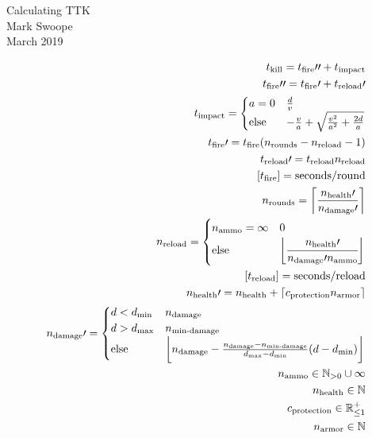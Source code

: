 \documentclass[a4paper,12pt]{article}
\begin{document}
	\begin{center}
		Calculating TTK \\
		Mark Swoope \\
		March 2019 \\
	\end{center}
	\begin{align*}
		t_\text{kill} = t_\text{fire}\prime\prime + t_\text{impact} \\
		t_\text{fire}\prime\prime = t_\text{fire}\prime + t_\text{reload}\prime \\
		t_\text{impact} =
			\begin{cases}
				a = 0 & \frac{d}{v} \\
				\text{else} & -\frac{v}{a} + \sqrt{\frac{v^2}{a^2} + \frac{2d}{a}} \\
			\end{cases} \\
		t_\text{fire}\prime = t_\text{fire}(n_\text{rounds} - n_\text{reload} - 1) \\
		t_\text{reload}\prime = t_\text{reload} n_\text{reload} \\
		[t_\text{fire}] = \text{seconds} / \text{round} \\
		n_\text{rounds} = \bigg \lceil \frac{n_\text{health}\prime}{n_\text{damage}\prime} \bigg \rceil \\
		n_\text{reload} = 
			\begin{cases}
				n_\text{ammo} = \infty & 0 \\
				\text{else} & \bigg \lfloor \cfrac{n_\text{health}\prime}{n_\text{damage}\prime n_\text{ammo}} \bigg \rfloor \\
			\end{cases} \\
		[t_\text{reload}] = \text{seconds} / \text{reload}  \\
		n_\text{health}\prime = n_\text{health} + \lceil c_\text{protection} n_\text{armor} \rceil \\
		n_\text{damage}\prime = 
			\begin{cases}
				d < d_\text{min} & n_\text{damage} \\
				d > d_\text{max} & n_\text{min-damage} \\
				\text{else} & \bigg \lfloor n_\text{damage} - \frac{n_\text{damage} - n_\text{min-damage}}{d_\text{max} - d_\text{min}} (d - d_\text{min}) \bigg \rfloor \\
			\end{cases} \\
		n_\text{ammo} \in \mathbb{N}_{>0} \cup \infty \\
		n_\text{health} \in \mathbb{N} \\
		c_\text{protection} \in \mathbb{R}^{+}_{\leq 1} \\
		n_\text{armor} \in \mathbb{N} \\
	\end{align*}
\end{document}
